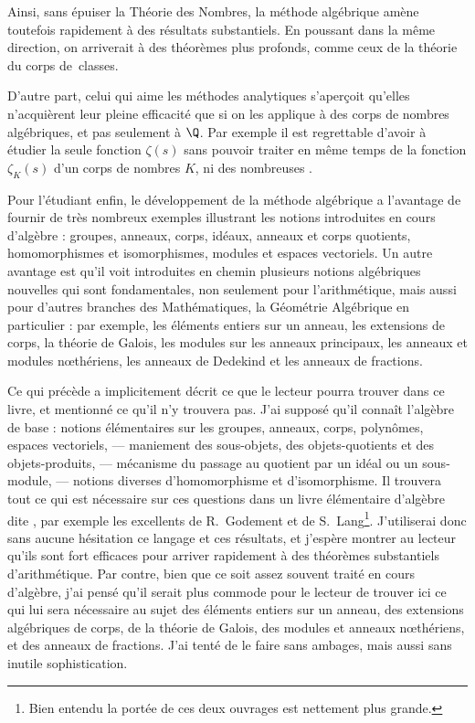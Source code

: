 \documentclass[11pt, useosf,
  title in boldface,
  theorem in new line,
  theorem numbering = section,
  number theorems separately,
]{simplivre}
\begin{document}
\enlargethispage*{\baselineskip}
    Ainsi, sans épuiser la Théorie des Nombres, la méthode algébrique amène toutefois rapidement à des résultats substantiels. En poussant dans la même direction, on arriverait à des théorèmes plus profonds, comme ceux de la théorie du corps de~classes.

    D'autre part, celui qui aime les méthodes analytiques s'aperçoit qu'elles n'acquièrent leur pleine efficacité que si on les applique à des corps de nombres algébriques, et pas seulement à \( \Q \). Par exemple il est regrettable d'avoir à étudier la seule fonction \( \zeta(s) \) sans pouvoir traiter en même temps de la fonction \( \zeta_K(s) \) d'un corps de nombres \( K \), ni des nombreuses .

    Pour l'étudiant enfin, le développement de la méthode algébrique a l'avantage de fournir de très nombreux exemples illustrant les notions introduites en cours d'algèbre : groupes, anneaux, corps, idéaux, anneaux et corps quotients, homomorphismes et isomorphismes, modules et espaces vectoriels. Un autre avantage est qu'il voit introduites en chemin plusieurs notions algébriques nouvelles qui sont fondamentales, non seulement pour l'arithmétique, mais aussi pour d'autres branches des Mathématiques, la Géométrie Algébrique en particulier : par exemple, les éléments entiers sur un anneau, les extensions de corps, la théorie de Galois, les modules sur les anneaux principaux, les anneaux et modules nœthériens, les anneaux de Dedekind et les anneaux de fractions.

    Ce qui précède a implicitement décrit ce que le lecteur pourra trouver dans ce livre, et mentionné ce qu'il n'y trouvera pas. J'ai supposé qu'il connaît l'algèbre de base : notions élémentaires sur les groupes, anneaux, corps, polynômes, espaces vectoriels, --- maniement des sous-objets, des objets-quotients et des objets-produits, --- mécanisme du passage au quotient par un idéal ou un sous-module, --- notions diverses d'homomorphisme et d'isomorphisme. Il trouvera tout ce qui est nécessaire sur ces questions dans un livre élémentaire d'algèbre dite , par exemple les excellents  de R.~Godement et  de S.~Lang\footnote{Bien entendu la portée de ces deux ouvrages est nettement plus grande.}. J'utiliserai donc sans aucune hésitation ce langage et ces résultats, et j'espère montrer au lecteur qu'ils sont fort efficaces pour arriver rapidement à des théorèmes substantiels d'arithmétique. Par contre, bien que ce soit assez souvent traité en cours d'algèbre, j'ai pensé qu'il serait plus commode pour le lecteur de trouver ici ce qui lui sera nécessaire au sujet des éléments entiers sur un anneau, des extensions algébriques de corps, de la théorie de Galois, des modules et anneaux nœthériens, et des anneaux de fractions. J'ai tenté de le faire sans ambages, mais aussi sans inutile sophistication.
\end{document}
